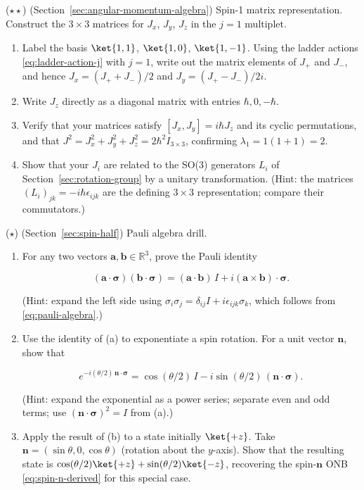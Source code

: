 \begin{problemset}
\item ($\star\star$) (Section~\ref{sec:angular-momentum-algebra}) Spin-1 matrix representation. Construct the $3\times3$ matrices for $J_x$, $J_y$, $J_z$ in the $j=1$ multiplet.
\begin{enumerate}
\item[(a)] Label the basis $\ket{1,1}$, $\ket{1,0}$, $\ket{1,-1}$. Using the ladder actions \eqref{eq:ladder-action-j} with $j=1$, write out the matrix elements of $J_+$ and $J_-$, and hence $J_x = (J_+ + J_-)/2$ and $J_y = (J_+ - J_-)/2i$.
\item[(b)] Write $J_z$ directly as a diagonal matrix with entries $\hbar,0,-\hbar$.
\item[(c)] Verify that your matrices satisfy $[J_x, J_y] = i\hbar J_z$ and its cyclic permutations, and that $J^2 = J_x^2 + J_y^2 + J_z^2 = 2\hbar^2 I_{3\times3}$, confirming $\lambda_1 = 1(1+1) = 2$.
\item[(d)] Show that your $J_i$ are related to the SO(3) generators $L_i$ of Section~\ref{sec:rotation-group} by a unitary transformation. (Hint: the matrices $(L_i)_{jk} = -i\hbar\epsilon_{ijk}$ are the defining $3\times3$ representation; compare their commutators.)
\end{enumerate}

\item ($\star$) (Section~\ref{sec:spin-half}) Pauli algebra drill.
\begin{enumerate}
\item[(a)] For any two vectors $\bm a, \bm b \in \mathbb{R}^3$, prove the Pauli identity
\begin{linenomath}
\begin{equation*}
(\bm a\cdot\bm\sigma)(\bm b\cdot\bm\sigma) = (\bm a\cdot\bm b)\,I + i(\bm a\times\bm b)\cdot\bm\sigma .
\end{equation*}
\end{linenomath}
(Hint: expand the left side using $\sigma_i\sigma_j = \delta_{ij}I + i\epsilon_{ijk}\sigma_k$, which follows from \eqref{eq:pauli-algebra}.)
\item[(b)] Use the identity of (a) to exponentiate a spin rotation. For a unit vector $\bm n$, show that
\begin{linenomath}
\begin{equation*}
e^{-i(\theta/2)\,\bm n\cdot\bm\sigma}
= \cos(\theta/2)\,I - i\sin(\theta/2)\,(\bm n\cdot\bm\sigma) .
\end{equation*}
\end{linenomath}
(Hint: expand the exponential as a power series; separate even and odd terms; use $(\bm n\cdot\bm\sigma)^2 = I$ from (a).)
\item[(c)] Apply the result of (b) to a state initially $\ket{+z}$. Take $\bm n = (\sin\theta, 0, \cos\theta)$ (rotation about the $y$-axis). Show that the resulting state is $\cos(\theta/2)\ket{+z} + \sin(\theta/2)\ket{-z}$, recovering the spin-$\bm n$ ONB \eqref{eq:spin-n-derived} for this special case.
\end{enumerate}


\end{problemset}

